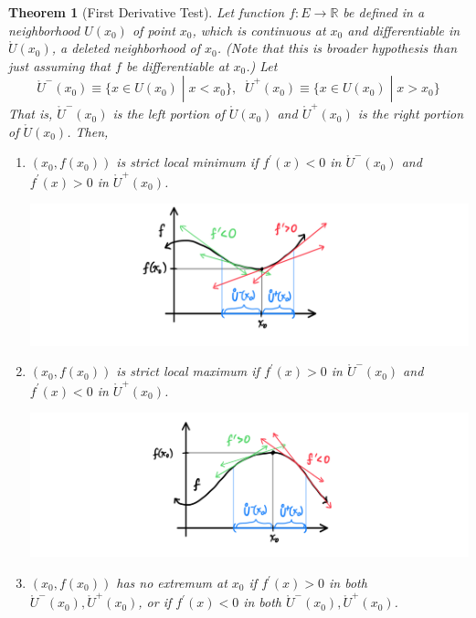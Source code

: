\documentclass{article}
\newtheorem{theorem}{Theorem}[section]
\theoremstyle{remark}
\theoremstyle{definition}
\begin{document}
\begin{theorem}[First Derivative Test]
Let function $f: E \longrightarrow \mathbb{R}$ be defined in a neighborhood $U(x_0)$ of point $x_0$, which is continuous at $x_0$ and differentiable in $\mathring{U}(x_0)$, a deleted neighborhood of $x_0$. (Note that this is broader hypothesis than just assuming that $f$ be differentiable at $x_0$.) Let
\[\mathring{U}^- (x_0) \equiv \{x \in U(x_0) \;|\; x < x_0\}, \;\; \mathring{U}^+ (x_0) \equiv \{x \in U(x_0) \;|\; x > x_0\}\]
That is, $\mathring{U}^- (x_0)$ is the left portion of $\mathring{U}(x_0)$ and $\mathring{U}^+ (x_0)$ is the right portion of $\mathring{U}(x_0)$. Then, 
\begin{enumerate}
    \item $(x_0, f(x_0))$ is strict local minimum if $f^\prime(x) < 0$ in $\mathring{U}^- (x_0)$ and $f^\prime (x) > 0$ in $\mathring{U}^+ (x_0)$. 
    \begin{center}
        \includegraphics[scale=0.3]{img/Strict_Local_minimum.PNG}
    \end{center}
    \item $(x_0, f(x_0))$ is strict local maximum if $f^\prime(x) > 0$ in $\mathring{U}^- (x_0)$ and $f^\prime (x) < 0$ in $\mathring{U}^+ (x_0)$. 
    \begin{center}
        \includegraphics[scale=0.3]{img/Strict_Local_Maximum.PNG}
    \end{center}
    \item $(x_0, f(x_0))$ has no extremum at $x_0$ if $f^\prime (x) > 0$ in both $\mathring{U}^- (x_0), \mathring{U}^+ (x_0)$, or if $f^\prime(x)< 0$ in both $\mathring{U}^- (x_0), \mathring{U}^+ (x_0)$. 

\end{enumerate}
\end{theorem}
\end{document}
